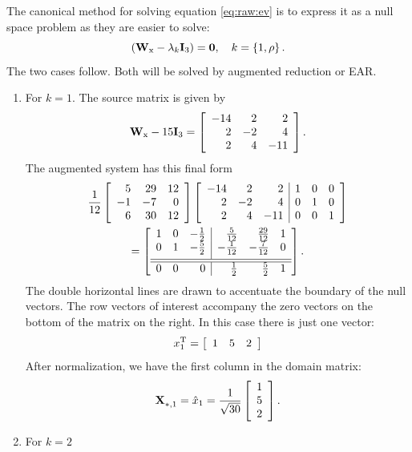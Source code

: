 The canonical method for solving equation \eqref{eq:raw:ev} is to express it as a null space problem as they are easier to solve:
\begin{equation}
  \paren{\W{x} - \lambda_{k}\I{3}} = \zero, \quad k=\lst{1,\rho}.
\end{equation}
The two cases follow. Both will be solved by augmented reduction or EAR.
\begin{enumerate}
\item For $k=1$. The source matrix is given by
\begin{equation}
\W{x}-15\I{3} =
\left[
\begin{array}{rrr}
 -14 & 2 & 2 \\
 2 & -2 & 4 \\
 2 & 4 & -11
\end{array}
\right]. 
\end{equation}
The augmented system has this final form
\begin{multline}
\frac{1}{12}
\left[
\begin{array}{rrr}
 5  & 29 & 12 \\
 -1 & -7 & 0 \\
 6  & 30 & 12
\end{array}
\right]
\mat{rrr|ccc}
{
-14 & 2 & 2 & 1 & 0 & 0 \\
 2 & -2 & 4 & 0 & 1 & 0 \\
 2 & 4 &-11 & 0 & 0 & 1
}\\
=
\mat{crr|rrc}
{
1 & 0 & -\frac{1}{2}  &  \frac{5}{12} & \frac{29}{12} & 1 \\
0 & 1 & -\frac{5}{2}  & -\frac{1}{12} & -\frac{7}{12} & 0 \\[4pt]\hline\hline
0 & 0 & 0             &  \frac{1}{2}  & \frac{5}{2}   & 1
}.
\end{multline}
The double horizontal lines are drawn to accentuate the boundary of the null vectors. The row vectors of interest accompany the zero vectors on the bottom of the matrix on the right. In this case there is just one vector:
\begin{equation}
  x_{1}^{\mathrm{T}} = \mat{ccc}{1&5&2}
\end{equation}
After normalization, we have the first column in the domain matrix:
\begin{equation}
  \X{}_{*,1} = \hat{x}_{1} = \frac{1}{\sqrt{30}}\mat{c}{1\\5\\2}.
\end{equation}
\item For $k=2$
\begin{equation}

\end{equation}
\end{enumerate}
